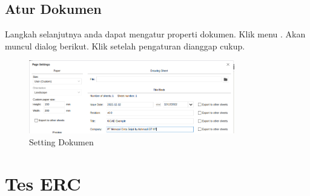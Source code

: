 \documentclass[12pt]{book}
\begin{document}
	\newpage
	\subsection{Atur Dokumen}
	Langkah selanjutnya anda dapat mengatur properti dokumen.
	Klik menu .
	Akan muncul dialog berikut.
	Klik  setelah pengaturan dianggap cukup.

	\begin{figure}[!ht]
		\centering
		\includegraphics[width=0.8\textwidth]{images/sch/sch_set}
		\caption{Setting Dokumen}
	\end{figure}

	\section{Tes ERC}
\end{document}
